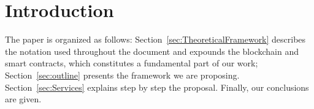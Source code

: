 \section{Introduction}

The paper is organized as follows: 
Section~\ref{sec:TheoreticalFramework} describes the notation used 
throughout the document and expounds the blockchain and smart contracts, 
which constitutes a fundamental part of our work; 
Section~\ref{sec:outline} presents the framework we are proposing. 
Section~\ref{sec:Services} explains step by step the proposal.
Finally, our conclusions are given.